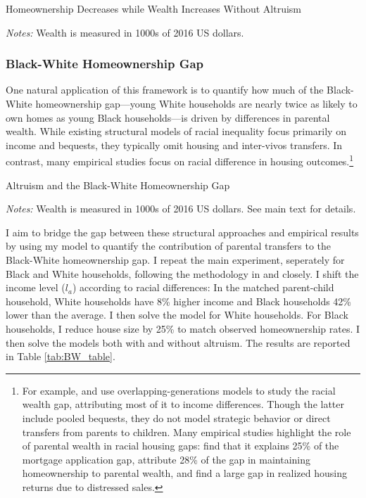 \documentclass[12pt]{article}
\begin{document}
\begin{table}[tb]
	\center 
	\begin{threeparttable}
		\caption{Homeownership Decreases while Wealth Increases Without Altruism}\label{tab:modelfitnoa}
		
		\footnotesize
		\textit{Notes:} Wealth is measured in 1000s of 2016 US dollars.
	\end{threeparttable}
\end{table}

\subsubsection{Black-White Homeownership Gap}\label{sec:bwgap}
One natural application of this framework is to quantify how much of the Black-White homeownership gap---young White households are nearly twice as likely to own homes as young Black households---is driven by differences in parental wealth. While existing structural models of racial inequality focus primarily on income and bequests, they typically omit housing and inter-vivos transfers. In contrast, many empirical studies focus on racial difference in housing outcomes.\footnote{For example, \citet{Ashman2020} and \citet{aliprantis2022dynamics} use overlapping-generations models to study the racial wealth gap, attributing most of it to income differences. Though the latter include pooled bequests, they do not model strategic behavior or direct transfers from parents to children. Many empirical studies highlight the role of parental wealth in racial housing gaps: \citet{charles2002transition} find that it explains 25\% of the mortgage application gap,  \citet{bond2021role} attribute 28\% of the gap in maintaining homeownership to parental wealth, and \cite{kermani2021racial} find a large gap in realized housing returns due to distressed sales.}

\begin{table}
	\center
\begin{threeparttable}[tb]
				\singlespacing
		\caption{Altruism and the Black-White Homeownership Gap}\label{tab:BW_table}
		
		\footnotesize
		\textit{Notes:} Wealth is measured in 1000s of 2016 US dollars. See main text for details.
	\end{threeparttable}
\end{table}


I aim to bridge the gap between these structural approaches and empirical results by using my model to quantify the contribution of parental transfers to the Black-White homeownership gap. I repeat the main experiment, seperately for Black and White households, following the methodology in \cite{Ashman2020} and \cite{aliprantis2022dynamics} closely. I shift the income level ($l_a$) according to racial differences: In the matched parent-child household, White households have 8\% higher income and Black households 42\% lower than the average. I then solve the model for White households. For Black households, I reduce house size by 25\% to match observed homeownership rates. I then solve the models both with and without altruism. The results are reported in Table \ref{tab:BW_table}. 
\end{document}
